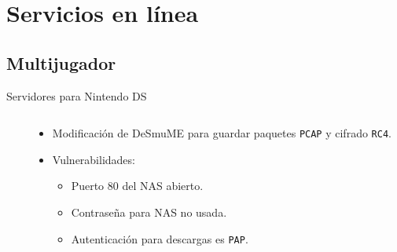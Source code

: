 
\section{Servicios en línea}
\subsection{Multijugador}
\begin{frame}{Servidores para Nintendo DS}
\begin{columns}

\begin{column}{0.5\textwidth}
\begin{center}
\end{center}
\end{column}

\begin{column}{0.5\textwidth}
\begin{itemize}
    \item<2-> Modificación de DeSmuME para guardar paquetes \texttt{PCAP} y cifrado \texttt{RC4}.

    \item<4-> Vulnerabilidades:
    \begin{itemize}
        \item<5-> Puerto 80 del NAS abierto.

        \item<6-> Contraseña para NAS no usada.

        \item<7-> Autenticación para descargas es \texttt{PAP}.
    \end{itemize}
\end{itemize}
\end{column}

\end{columns}
\end{frame}

